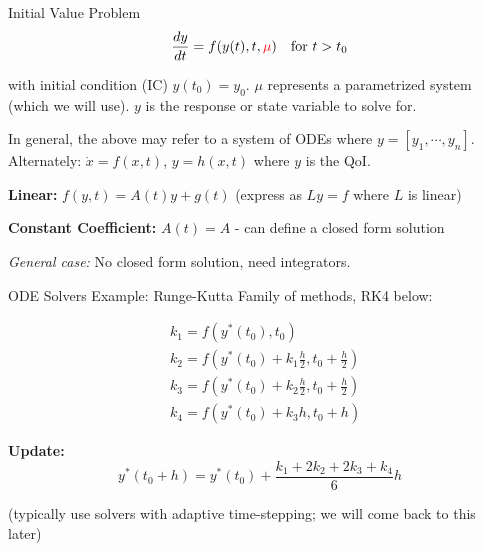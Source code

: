 \documentclass[usenames,dvipsnames]{beamer}
\theoremstyle{definition}
\begin{document}
\begin{frame}{Initial Value Problem}
    $$\frac{dy}{dt} = f(y(t), t, \textcolor{red}{\mu}) \quad \text{for } t > t_0$$

    with initial condition (IC) $y(t_0) = y_0$. $\mu$ represents a parametrized system (which we will use). $y$ is the response or state variable to solve for.

    In general, the above may refer to a system of ODEs where $y = [y_1, \cdots, y_n]$. Alternately: $\dot{x} = f(x, t)$, $y = h(x, t)$ where $y$ is the QoI.
    
    \textbf{Linear:} $f(y, t) = A(t)y + g(t)$ (express as $Ly=f$ where $L$ is linear)
    
    \textbf{Constant Coefficient:} $A(t)=A$ - can define a closed form solution
    
    \emph{General case:} No closed form solution, need integrators.
\end{frame}




\begin{frame}{ODE Solvers}
    Example: Runge-Kutta Family of methods, RK4 below:

    $$\begin{aligned}
        &k_{1} =f(y^*(t_0),t_0)  \\
        &k_{2} =f\left(y^*(t_0)+k_1\frac h2,t_0+\frac h2\right)  \\
        &k_{3} =f\left(y^*(t_0)+k_2\frac h2,t_0+\frac h2\right)  \\
        &k_{4} =f\left(y^*(t_0)+k_3h,t_0+h\right) 
    \end{aligned}$$

    \textbf{Update:}$$y^*(t_0+h)=y^*(t_0)+\frac{k_1+2k_2+2k_3+k_4}6h$$

    (typically use solvers with adaptive time-stepping; we will come back to this later)

\end{frame}
\end{document}
